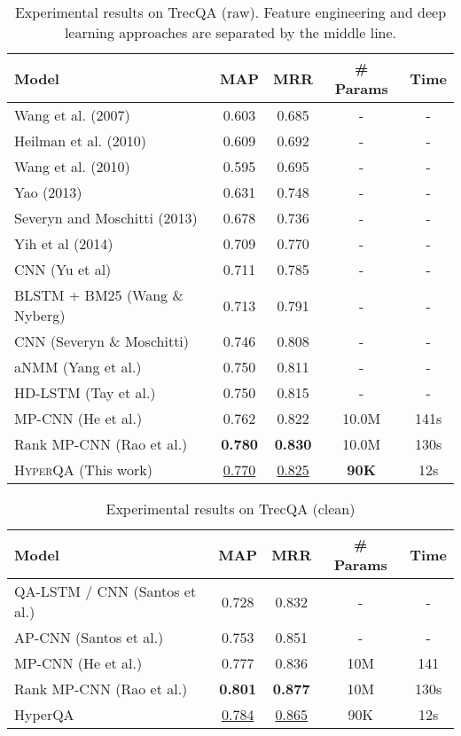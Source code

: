 \documentclass[sigconf]{acmart}
\begin{document}
\begin{table}[ht]
  \centering
  \small
    \begin{tabular}{lcccc}
    \hline
    Model & MAP   & MRR   & \# Params & Time \\
    \hline
    Wang et al. (2007) & 0.603 & 0.685 & -     & - \\
    Heilman et al. (2010) & 0.609 & 0.692 & -     & - \\
    Wang et al. (2010)  & 0.595 & 0.695 & -     & - \\
    Yao (2013) & 0.631 & 0.748 & -     & - \\
    Severyn and Moschitti (2013) & 0.678 & 0.736 & -     & - \\
    Yih et al (2014) & 0.709 & 0.770  & -     & - \\
    \hline
    CNN (Yu et al) & 0.711 & 0.785 & -     & - \\
    BLSTM + BM25 (Wang \& Nyberg) & 0.713 & 0.791 & -     & - \\
    CNN (Severyn \&  Moschitti)   & 0.746 & 0.808 & -     & - \\
    aNMM (Yang et al.)  & 0.750 & 0.811 & -     & - \\
    HD-LSTM (Tay et al.) & 0.750 & 0.815 & -     & - \\
MP-CNN  (He et al.) & 0.762 & 0.822 & 10.0M   & 141s \\
    Rank MP-CNN (Rao et al.) & \textbf{0.780}  & \textbf{0.830} & 10.0M  &  130s\\
    \hline
    \textsc{HyperQA} (This work) & \underline{0.770} & \underline{0.825} & \textbf{90K}   & 12s \\
    \hline
    \end{tabular}\caption{Experimental results on TrecQA (raw). Feature engineering and deep learning approaches are separated by the middle line.}
  \label{tab:trec_results}\end{table}

\begin{table}[htbp]
  \centering
  \small
    \begin{tabular}{lcccc}
    \hline
    Model & MAP   & MRR   &  \# Params     &  Time\\
    \hline
    QA-LSTM /  CNN (Santos et al.) & 0.728 & 0.832 &  -     & - \\
    AP-CNN (Santos et al.) & 0.753 & 0.851 &    -   & - \\
    MP-CNN (He et al.) & 0.777 & 0.836 & 10M   & 141 \\
    Rank MP-CNN (Rao et al.) & \textbf{0.801} & \textbf{0.877} & 10M   & 130s \\
    \hline
    HyperQA & \underline{0.784} & \underline{0.865} & 90K      & 12s \\
    \hline
    \end{tabular}\caption{Experimental results on TrecQA (clean)}
  \label{tab:trec_results_2}\end{table}
\end{document}
